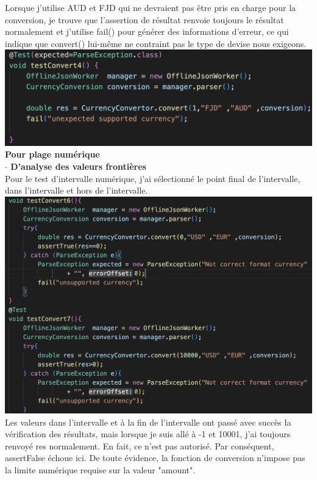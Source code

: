 \documentclass{article}
\begin{document}
Lorsque j'utilise AUD et FJD qui ne devraient pas être pris en charge pour la conversion, je trouve que l'assertion de résultat renvoie toujours le résultat normalement et j'utilise fail() pour générer des informations d'erreur, ce qui indique que convert() lui-même ne contraint pas le type de devise nous exigeons.\\
\includegraphics[scale=0.3]{G3.png}\\

\textbf{Pour plage numérique}\\

\textbf{$\cdot$ D’analyse des valeurs frontières}\\

Pour le test d'intervalle numérique, j'ai sélectionné le point final de l'intervalle, dans l'intervalle et hors de l'intervalle.\\
\includegraphics[scale=0.3]{G4.png} \\

Les valeurs dans l'intervalle et à la fin de l'intervalle ont passé avec succès la vérification des résultats, mais lorsque je suis allé à -1 et 10001, j'ai toujours renvoyé res normalement. En fait, ce n'est pas autorisé. Par conséquent, assertFalse échoue ici. De toute évidence, la fonction de conversion n'impose pas la limite numérique requise sur la valeur "amount".\\
\end{document}
